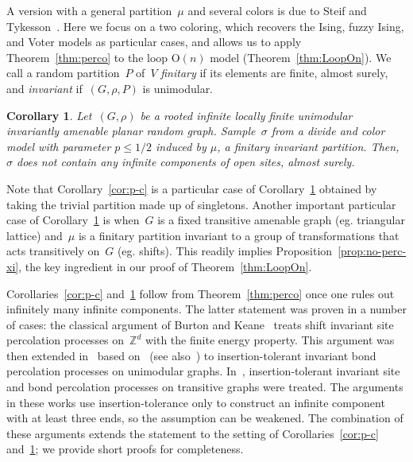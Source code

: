 \documentclass[11pt,letterpaper]{amsart}
\newcounter{n}
\numberwithin{n}{section}
\theoremstyle{plain}
\newtheorem{corollary}[n]{Corollary}
\theoremstyle{definition}
\theoremstyle{remark}
\renewcommand\O[1]{\(\mathrm{O}(#1)\)}
\newcommand\Z{\mathbb Z}
\newcommand{\1}{\mathbbm{1}}
\begin{document}
A version with a general partition~$\mu$ and several colors is due to Steif and Tykesson~\cite{SteTyk19}. Here we focus on a two coloring, which recovers the Ising, fuzzy Ising, and Voter models as particular cases, and allows us to apply Theorem~\ref{thm:perco} to the loop \O{n} model (Theorem~\ref{thm:LoopOn}).
We call a random partition~$P$ of~$V$ {\em finitary} if its elements are finite, almost surely, and {\em invariant} if~$(G,\rho,P)$ is unimodular.

\begin{corollary}\label{cor:divide-color}
	Let~$(G,\rho)$ be a rooted infinite locally finite unimodular invariantly amenable planar random graph.
	Sample~$\sigma$ from a divide and color model with parameter $p \leq 1/2$ induced by $\mu$, a finitary invariant partition. Then, $\sigma$ does not contain any infinite components of open sites, almost surely. 
\end{corollary}

Note that Corollary~\ref{cor:p-c} is a particular case of Corollary~\ref{cor:divide-color} obtained by taking the trivial partition made up of singletons. Another important particular case of Corollary~\ref{cor:divide-color} is when~$G$ is a fixed transitive amenable graph (eg. triangular lattice) and~$\mu$ is a finitary partition invariant to a group of transformations that acts transitively on~$G$ (eg. shifts).
This readily implies Proposition~\ref{prop:no-perc-xi}, the key ingredient in our proof of Theorem~\ref{thm:LoopOn}.

Corollaries~\ref{cor:p-c} and~\ref{cor:divide-color} follow from Theorem~\ref{thm:perco} once one rules out infinitely many infinite components.
The latter statement was proven in a number of cases: 
the classical argument of Burton and Keane~\cite{BurKea89} treats shift invariant site percolation processes on~$\Z^d$ with the finite energy property. This argument was then extended in~\cite[Sections~$6,8$]{AldLyo07} based on~\cite{LyoSch99,BenLyoPer99,BenLyoPerSch01} (see also~\cite[Theorem~5.9]{AngHutNacRay18}) to insertion-tolerant invariant bond percolation processes on unimodular graphs.
In~\cite[Theorem~7.9]{LyoPer17}, insertion-tolerant invariant site and bond percolation processes on transitive graphs were treated. The arguments in these works use insertion-tolerance only to construct an infinite component with at least three ends, so the assumption can be weakened.
The combination of these arguments extends the statement to the setting of Corollaries~\ref{cor:p-c} and~\ref{cor:divide-color}; we provide short proofs for completeness.
\end{document}
